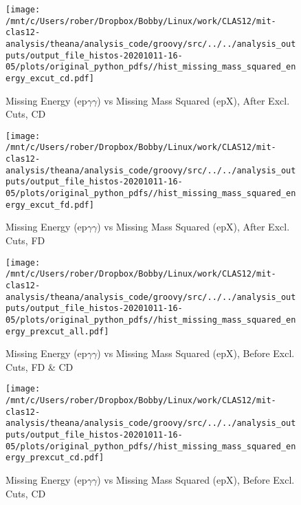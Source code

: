 \documentclass{article}
\begin{document}
\begin{landscape}
    \begin{figure}[h]
        \centering

        \texttt{[image: /mnt/c/Users/rober/Dropbox/Bobby/Linux/work/CLAS12/mit-clas12-analysis/theana/analysis\_code/groovy/src/../../analysis\_outputs/output\_file\_histos-20201011-16-05/plots/original\_python\_pdfs//hist\_missing\_mass\_squared\_energy\_excut\_cd.pdf]}
        \captionsetup{textformat=empty,labelformat=blank}
        \caption{Missing Energy (ep$\gamma$$\gamma$) vs Missing Mass Squared (epX), After Excl. Cuts, CD}
    \end{figure}
    \clearpage
    
    \begin{figure}[h]
        \centering

        \texttt{[image: /mnt/c/Users/rober/Dropbox/Bobby/Linux/work/CLAS12/mit-clas12-analysis/theana/analysis\_code/groovy/src/../../analysis\_outputs/output\_file\_histos-20201011-16-05/plots/original\_python\_pdfs//hist\_missing\_mass\_squared\_energy\_excut\_fd.pdf]}
        \captionsetup{textformat=empty,labelformat=blank}
        \caption{Missing Energy (ep$\gamma$$\gamma$) vs Missing Mass Squared (epX), After Excl. Cuts, FD}
    \end{figure}
    \clearpage
    
    \begin{figure}[h]
        \centering

        \texttt{[image: /mnt/c/Users/rober/Dropbox/Bobby/Linux/work/CLAS12/mit-clas12-analysis/theana/analysis\_code/groovy/src/../../analysis\_outputs/output\_file\_histos-20201011-16-05/plots/original\_python\_pdfs//hist\_missing\_mass\_squared\_energy\_prexcut\_all.pdf]}
        \captionsetup{textformat=empty,labelformat=blank}
        \caption{Missing Energy (ep$\gamma$$\gamma$) vs Missing Mass Squared (epX), Before Excl. Cuts, FD \& CD}
    \end{figure}
    \clearpage
    
    \begin{figure}[h]
        \centering

        \texttt{[image: /mnt/c/Users/rober/Dropbox/Bobby/Linux/work/CLAS12/mit-clas12-analysis/theana/analysis\_code/groovy/src/../../analysis\_outputs/output\_file\_histos-20201011-16-05/plots/original\_python\_pdfs//hist\_missing\_mass\_squared\_energy\_prexcut\_cd.pdf]}
        \captionsetup{textformat=empty,labelformat=blank}
        \caption{Missing Energy (ep$\gamma$$\gamma$) vs Missing Mass Squared (epX), Before Excl. Cuts, CD}
    \end{figure}
    \clearpage
    

\end{landscape}
\end{document}
